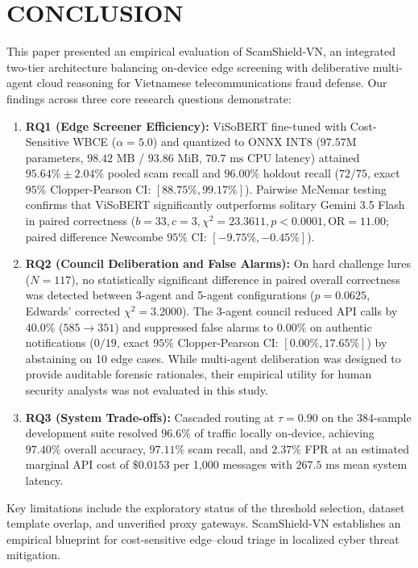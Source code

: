 \section{CONCLUSION}
\label{sec:conclusion}

This paper presented an empirical evaluation of ScamShield-VN, an integrated two-tier architecture balancing on-device edge screening with deliberative multi-agent cloud reasoning for Vietnamese telecommunications fraud defense. Our findings across three core research questions demonstrate:
\begin{enumerate}
    \item \textbf{RQ1 (Edge Screener Efficiency):} ViSoBERT fine-tuned with Cost-Sensitive WBCE ($\alpha = 5.0$) and quantized to ONNX INT8 ($97.57\text{M}$ parameters, $98.42\text{ MB}$ / $93.86\text{ MiB}$, $70.7\text{ ms}$ CPU latency) attained $95.64\% \pm 2.04\%$ pooled scam recall and $96.00\%$ holdout recall ($72/75$, exact $95\%$ Clopper-Pearson CI: $[88.75\%, 99.17\%]$). Pairwise McNemar testing confirms that ViSoBERT significantly outperforms solitary Gemini 3.5 Flash in paired correctness ($b=33, c=3, \chi^2 = 23.3611, p < 0.0001, \text{OR} = 11.00$; paired difference Newcombe $95\%$ CI: $[-9.75\%, -0.45\%]$).
    \item \textbf{RQ2 (Council Deliberation and False Alarms):} On hard challenge lures ($N=117$), no statistically significant difference in paired overall correctness was detected between 3-agent and 5-agent configurations ($p = 0.0625$, Edwards' corrected $\chi^2 = 3.2000$). The 3-agent council reduced API calls by $40.0\%$ ($585 \to 351$) and suppressed false alarms to $0.00\%$ on authentic notifications ($0/19$, exact $95\%$ Clopper-Pearson CI: $[0.00\%, 17.65\%]$) by abstaining on 10 edge cases. While multi-agent deliberation was designed to provide auditable forensic rationales, their empirical utility for human security analysts was not evaluated in this study.
    \item \textbf{RQ3 (System Trade-offs):} Cascaded routing at $\tau = 0.90$ on the $384$-sample development suite resolved $96.6\%$ of traffic locally on-device, achieving $97.40\%$ overall accuracy, $97.11\%$ scam recall, and $2.37\%$ FPR at an estimated marginal API cost of $\$0.0153$ per 1,000 messages with $267.5\text{ ms}$ mean system latency.
\end{enumerate}

Key limitations include the exploratory status of the threshold selection, dataset template overlap, and unverified proxy gateways. ScamShield-VN establishes an empirical blueprint for cost-sensitive edge--cloud triage in localized cyber threat mitigation.